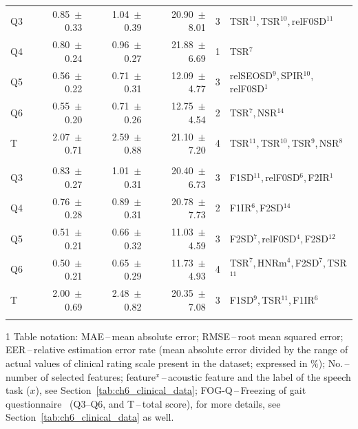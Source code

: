 \begin{table}[htb!]
\begin{threeparttable}
\begin{tabular}{l r r r c l}
			Q3 & 0.85~$\pm$~0.33 & 1.04~$\pm$~0.39 & 20.90~$\pm$~8.01 & 3 & TSR$^{11}$,\,TSR$^{10}$,\,relF0SD$^{11}$ \\
			Q4 & 0.80~$\pm$~0.24 & 0.96~$\pm$~0.27 & 21.88~$\pm$~6.69 & 1 & TSR$^{7}$ \\
			Q5 & 0.56~$\pm$~0.22 & 0.71~$\pm$~0.31 & 12.09~$\pm$~4.77 & 3 & relSEOSD$^{9}$,\,SPIR$^{10}$,\,relF0SD$^{1}$ \\
			Q6 & 0.55~$\pm$~0.20 & 0.71~$\pm$~0.26 & 12.75~$\pm$~4.54 & 2 & TSR$^{7}$,\,NSR$^{14}$ \\
			T  & 2.07~$\pm$~0.71 & 2.59~$\pm$~0.88 & 21.10~$\pm$~7.20 & 4 & TSR$^{11}$,\,TSR$^{10}$,\,TSR$^{9}$,\,NSR$^{8}$ \\

			\noalign{\smallskip}\hline\noalign{\smallskip}
			\multicolumn{6}{c}{Combination} \\
			\noalign{\smallskip}\hline\noalign{\smallskip}

			Q3 & 0.83~$\pm$~0.27 & 1.01~$\pm$~0.31 & 20.40~$\pm$~6.73 & 3 & F1SD$^{11}$,\,relF0SD$^{6}$,\,F2IR$^{1}$ \\
			Q4 & 0.76~$\pm$~0.28 & 0.89~$\pm$~0.31 & 20.78~$\pm$~7.73 & 2 & F1IR$^{6}$,\,F2SD$^{14}$ \\
			Q5 & 0.51~$\pm$~0.21 & 0.66~$\pm$~0.32 & 11.03~$\pm$~4.59 & 3 & F2SD$^{7}$,\,relF0SD$^{4}$,\,F2SD$^{12}$ \\
			Q6 & 0.50~$\pm$~0.21 & 0.65~$\pm$~0.29 & 11.73~$\pm$~4.93 & 4 & TSR$^{7}$,\,HNRm$^{4}$,\,F2SD$^{7}$,\,TSR$^{11}$ \\
			T  & 2.00~$\pm$~0.69 & 2.48~$\pm$~0.82 & 20.35~$\pm$~7.08 & 3 & F1SD$^{9}$,\,TSR$^{11}$,\,F1IR$^{6}$ \\
	
			\noalign{\smallskip}\hline\hline
		\end{tabular}
	
		\begin{tablenotes}
		\scriptsize
			\item[1] Table notation: MAE\,--\,mean absolute error; RMSE\,--\,root mean squared error; EER\,--\,relative estimation error rate (mean absolute error divided by the range of actual values of clinical rating scale present in the dataset; expressed in $\%$); No.\,--\,number of selected features; feature$^{x}$\,--\,acoustic feature and the label of the speech task ($x$), see Section~\ref{tab:ch6_clinical_data}; FOG-Q\,--\,Freezing of gait questionnaire~\cite{Giladi2000} (Q3--Q6, and T\,--\,total score), for more details, see Section~\ref{tab:ch6_clinical_data} as well.
		\end{tablenotes}
	\end{threeparttable}
\end{table}


